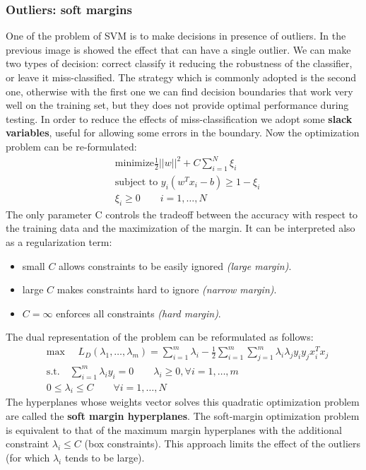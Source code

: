 \subsubsection{Outliers: soft margins}
One of the problem of SVM is to make decisions in presence of outliers.
In the previous image is showed the effect that can have a single outlier. We can make two types of decision: correct classify it reducing the robustness of the classifier, or leave it miss-classified. The strategy which is commonly adopted is the second one, otherwise with the first one we can find decision boundaries that work very well on the training set, but they does not provide optimal performance during testing. In order to reduce the effects of miss-classification we adopt some \textbf{slack variables}, useful for allowing some errors in the boundary.
Now the optimization problem can be re-formulated:
\begin{equation*}
\begin{aligned}
&\text{minimize} \frac{1}{2}||w||^2+ C\sum\limits_{i = 1}^N\xi_i\\
&\text{subject to } y_i(w^Tx_i-b)\geq 1 - \xi_i\\
&\xi_i \geq 0 \qquad i = 1,\dots,N
\end{aligned}
\end{equation*}
The only parameter C controls the tradeoff between the accuracy with respect to the training data and the maximization of the margin. It can be interpreted also as a regularization term:
\begin{itemize}
	\item small $C$ allows constraints to be easily ignored \textit{(large margin)}.
	\item large $C$ makes constraints hard to ignore \textit{(narrow margin)}.
	\item $C = \infty$ enforces all constraints \textit{(hard margin)}.
\end{itemize}
The dual representation of the problem can be reformulated as follows:
\begin{equation*}
\begin{aligned}
&\text{max }\quad L_D(\lambda_1,\dots,\lambda_m) = \sum_{i = 1}^{m}\lambda_i - \frac{1}{2}\sum_{i = 1}^{m}\sum_{j = 1}^{m}\lambda_i\lambda_jy_iy_jx_i^Tx_j\\
&\text{s.t.} \quad \sum_{i = 1}^{m}\lambda_iy_i= 0 \qquad \lambda_i \geq 0, \forall i = 1,\dots,m\\
& 0 \leq \lambda_i \leq C \qquad \forall i = 1,\dots, N
\end{aligned}
\end{equation*}
The hyperplanes whose weights vector solves this quadratic optimization problem are called the \textbf{soft margin hyperplanes}. The soft-margin optimization problem is equivalent to that of the maximum margin hyperplanes with the additional constraint $\lambda_i \leq C$ (box constraints). This approach limits the effect of the outliers (for which $\lambda_i$ tends to be large).

